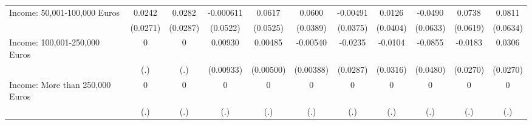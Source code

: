 {\begin{tabular}{l*{10}{c}}
Income: 50,001-100,000 Euros&      0.0242         &      0.0282         &   -0.000611         &      0.0617         &      0.0600         &    -0.00491         &      0.0126         &     -0.0490         &      0.0738         &      0.0811         \\
            &    (0.0271)         &    (0.0287)         &    (0.0522)         &    (0.0525)         &    (0.0389)         &    (0.0375)         &    (0.0404)         &    (0.0633)         &    (0.0619)         &    (0.0634)         \\
\addlinespace
Income: 100,001-250,000 Euros&           0         &           0         &     0.00930         &     0.00485         &    -0.00540         &     -0.0235         &     -0.0104         &     -0.0855         &     -0.0183         &      0.0306         \\
            &         (.)         &         (.)         &   (0.00933)         &   (0.00500)         &   (0.00388)         &    (0.0287)         &    (0.0316)         &    (0.0480)         &    (0.0270)         &    (0.0270)         \\
\addlinespace
Income: More than 250,000 Euros&           0         &           0         &           0         &           0         &           0         &           0         &           0         &           0         &           0         &           0         \\
            &         (.)         &         (.)         &         (.)         &         (.)         &         (.)         &         (.)         &         (.)         &         (.)         &         (.)         &         (.)         \\
\bottomrule
\end{tabular}
}
